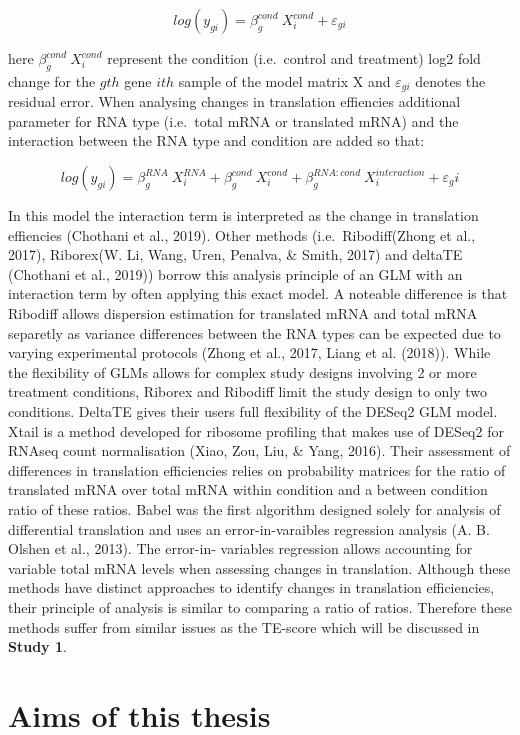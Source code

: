 \documentclass[12pt,openany]{book}
\begin{document}
\[log(y_{gi}) = \beta_g^{cond}\ X_i^{cond} + \varepsilon_{gi}\]

here \(\beta_g^{cond}\ X_i^{cond}\) represent the condition
(i.e.~control and treatment) log2 fold change for the \(gth\) gene
\(ith\) sample of the model matrix X and \(\varepsilon_{gi}\) denotes
the residual error. When analysing changes in translation effiencies
additional parameter for RNA type (i.e.~total mRNA or translated mRNA)
and the interaction between the RNA type and condition are added so
that:

\[log(y_{gi}) = \beta_g^{RNA}\ X_i^{RNA}+ \beta_g^{cond}\ X_i^{cond} + \beta_g^{RNA:cond}\ X_i^{interaction} + \varepsilon_gi\]

In this model the interaction term is interpreted as the change in
translation effiencies (Chothani et al., 2019). Other methods
(i.e.~Ribodiff(Zhong et al., 2017), Riborex(W. Li, Wang, Uren, Penalva,
\& Smith, 2017) and deltaTE (Chothani et al., 2019)) borrow this
analysis principle of an GLM with an interaction term by often applying
this exact model. A noteable difference is that Ribodiff allows
dispersion estimation for translated mRNA and total mRNA separetly as
variance differences between the RNA types can be expected due to
varying experimental protocols (Zhong et al., 2017, Liang et al.
(2018)). While the flexibility of GLMs allows for complex study designs
involving 2 or more treatment conditions, Riborex and Ribodiff limit the
study design to only two conditions. DeltaTE gives their users full
flexibility of the DESeq2 GLM model. Xtail is a method developed for
ribosome profiling that makes use of DESeq2 for RNAseq count
normalisation (Xiao, Zou, Liu, \& Yang, 2016). Their assessment of
differences in translation efficiencies relies on probability matrices
for the ratio of translated mRNA over total mRNA within condition and a
between condition ratio of these ratios. Babel was the first algorithm
designed solely for analysis of differential translation and uses an
error-in-varaibles regression analysis (A. B. Olshen et al., 2013). The
error-in- variables regression allows accounting for variable total mRNA
levels when assessing changes in translation. Although these methods
have distinct approaches to identify changes in translation
efficiencies, their principle of analysis is similar to comparing a
ratio of ratios. Therefore these methods suffer from similar issues as
the TE-score which will be discussed in \textbf{Study 1}.

\chapter{Aims of this thesis}
\end{document}
